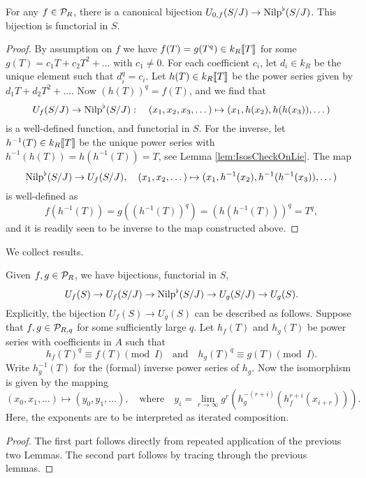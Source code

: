 \documentclass[../main.tex]{subfiles}
\begin{document}
\begin{lem}\label{lem:nilp0iso}
  For any $f \in \mathcal{P}_R$, there is a canonical 
  bijection $U_{0,f}(S/J) \to {\mathrm{Nilp}}^\flat(S/J)$. This bijection is functorial in 
  $S$.
\begin{proof}
  By assumption on $f$ we have $f(T) = g(T^{q}) \in k_R\llbracket T \rrbracket$ for some 
  $g(T) = c_1T + c_2T^2 + \dots$ with $c_1 \neq 0$. For each coefficient $c_i$, let
  $d_i \in k_R$ be the unique element such that $d_i^{q} = c_i$. Let
  $h(T) \in k_R\llbracket T \rrbracket$ be the power series given by $d_1 T + d_2
  T^2 + \dots$. Now $(h(T))^{q}=f(T)$, and we find that 
  \begin{equation*}
      U_f(S/J) \to {\mathrm{Nilp}}^\flat(S/J): \quad
      (x_1, x_2, x_3, \dots) \mapsto (x_1, h(x_2), h(h(x_3)), \dots)
  \end{equation*}
  is a well-defined function, and functorial in $S$. For the
  inverse, let $h^{-1}(T) \in k_R\llbracket T \rrbracket$ be the unique power
  series with $h^{-1}(h(T))= h(h^{-1}(T)) = T$, see Lemma
  \ref{lem:IsosCheckOnLie}. The map
  \begin{equation*}
      {\mathrm{Nilp}}^\flat(S/J) \to U_f(S/J), \quad 
      (x_1, x_2, \dots ) \mapsto (x_1, h^{-1}(x_2), h^{-1}(h^{-1}(x_3)), \dots)
  \end{equation*}
  is well-defined as
  \begin{equation*}
      f(h^{-1}(T)) = g((h^{-1}(T))^{q}) = (h(h^{-1}(T)))^{q} =
      T^{q},
  \end{equation*}
  and it is readily seen to be inverse to the map constructed above.
\end{proof}
\end{lem}

We collect results.
\begin{prop}\label{prop:pHTcalc}
  Given $f,g \in \mathcal{P}_R$, we have bijections, functorial in $S$,
  \begin{equation} 
    U_f(S) \to U_f(S/J) \to {\mathrm{Nilp}}^\flat(S/J) \to U_g(S/J) \to U_g(S).
  \end{equation}
  Explicitly, the bijection $U_f(S) \to U_g(S)$ can be described as follows.
  Suppose that $f,g \in \mathcal{P}_{R,q}$ for some sufficiently large $q$. 
  Let $h_f(T)$ and $h_g(T)$ be power series with coefficients in $A$ such that 
  $$h_f(T)^q \equiv f(T) \pmod I\quad\text{and}\quad h_g(T)^q \equiv g(T) \pmod
  I.$$
  Write $h_g^{-1}(T)$ for the (formal) inverse power series of $h_g$. 
  Now the isomorphism is given by the mapping
  \begin{equation*}
    (x_0, x_1, \dots) \mapsto (y_0, y_1, \dots), \quad \text{where} \quad y_i =
    \lim_{r \to \infty} g^r(h_g^{-(r+i)}(h_f^{r+i} (x_{i+r}))).
  \end{equation*}
  Here, the exponents are to be interpreted as iterated composition.
\begin{proof}
  The first part follows directly from repeated application of the previous
  two Lemmas. The second part follows by tracing through the previous lemmas.  
\end{proof}
\end{prop}
\end{document}
